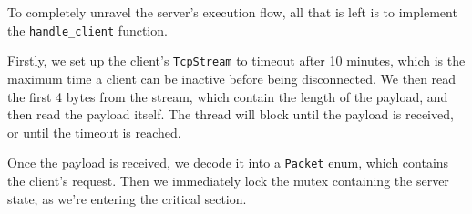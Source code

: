 \documentclass{article}
\newcommand{\code}[1]{\texttt{#1}}
\begin{document}
To completely unravel the server's execution flow, all that is left is to
implement the \code{handle\_client} function.

Firstly, we set up the client's \code{TcpStream} to timeout after 10 minutes,
which is the maximum time a client can be inactive before being disconnected. We
then read the first 4 bytes from the stream, which contain the length of the
payload, and then read the payload itself. The thread will block until the
payload is received, or until the timeout is reached.

Once the payload is received, we decode it into a \code{Packet} enum, which
contains the client's request. Then we immediately lock the mutex containing the
server state, as we're entering the critical section.

\end{document}
